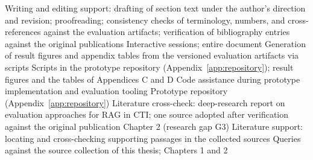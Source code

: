     {Writing and editing support: drafting of section text under the
     author's direction and revision; proofreading; consistency checks
     of terminology, numbers, and cross-references against the
     evaluation artifacts; verification of bibliography entries
     against the original publications}
    {Interactive sessions; entire document}
    {Generation of result figures and appendix tables from the
     versioned evaluation artifacts via scripts}
    {Scripts in the prototype repository
     (Appendix~\ref{app:repository}); result figures and the tables of
     Appendices C and D}
    {Code assistance during prototype implementation and evaluation
     tooling}
    {Prototype repository (Appendix~\ref{app:repository})}
    {Literature cross-check: deep-research report on evaluation
     approaches for RAG in CTI; one source adopted after verification
     against the original publication}
    {Chapter 2 (research gap G3)}
    {Literature support: locating and cross-checking supporting
     passages in the collected sources}
    {Queries against the source collection of this thesis;
     Chapters 1 and 2}
